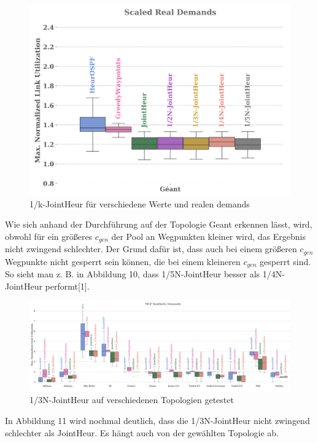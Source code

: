 \documentclass[sigconf,noacm,review]{acmart}
\begin{document}
\begin{figure}[h]
  \centering
  \includegraphics[width=\linewidth]{abbildungen/a32}
  \caption{1/k-JointHeur für verschiedene Werte und realen demands}
\end{figure}

Wie sich anhand der Durchführung auf der Topologie Geant erkennen lässt, wird, obwohl für ein größeres $c_{gen}$ der Pool an Wegpunkten kleiner wird, das Ergebnis nicht zwingend schlechter. Der Grund dafür ist, dass auch bei einem größeren  $c_{gen}$ Wegpunkte nicht gesperrt sein können, die bei einem kleineren  $c_{gen}$ gesperrt sind. So sieht man z. B. in Abbildung 10, dass  1/5N-JointHeur besser als 1/4N-JointHeur performt[1].

\begin{figure}[h]
  \centering
  \includegraphics[width=\linewidth]{abbildungen/a33}
  \caption{1/3N-JointHeur auf verschiedenen Topologien getestet}
\end{figure}

In Abbildung 11 wird nochmal deutlich, dass die 1/3N-JointHeur nicht zwingend schlechter als JointHeur. Es hängt auch von der gewählten Topologie ab.
\end{document}
